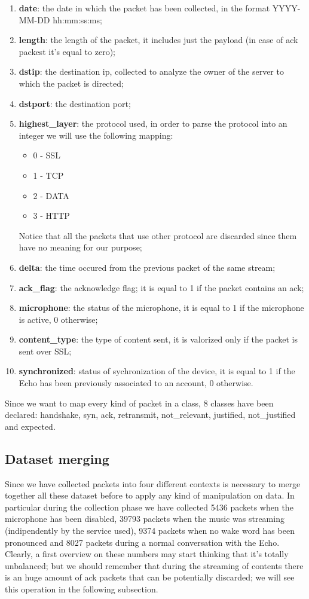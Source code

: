 \documentclass[sigconf]{acmart}
\begin{document}
    \begin{enumerate}
        \item \textbf{date}: the date in which the packet has been collected, in the format YYYY-MM-DD hh:mm:ss:ms;
        \item \textbf{length}: the length of the packet, it includes just the payload (in case of ack packest it's equal to zero);
        \item \textbf{dstip}: the destination ip, collected to analyze the owner of the server to which the packet is directed;
        \item \textbf{dstport}: the destination port;
        \item \textbf{highest\_layer}: the protocol used, in order to parse the protocol into an integer we will use the following mapping:
        \begin{itemize}
            \item 0 - SSL
            \item 1 - TCP
            \item 2 - DATA
            \item 3 - HTTP
        \end{itemize}
        Notice that all the packets that use other protocol are discarded since them have no meaning for our purpose;
        \item \textbf{delta}: the time occured from the previous packet of the same stream;
        \item \textbf{ack\_flag}: the acknowledge flag; it is equal to 1 if the packet contains an ack;
        \item \textbf{microphone}: the status of the microphone, it is equal to 1 if the microphone is active, 0 otherwise;
        \item \textbf{content\_type}: the type of content sent, it is valorized only if the packet is sent over SSL;
        \item \textbf{synchronized}: status of sychronization of the device, it is equal to 1 if the Echo has been previously associated to an account, 0 otherwise.
    \end{enumerate}
    Since we want to map every kind of packet in a class, 8 classes have been declared: handshake, syn, ack, retransmit, not\_relevant, justified, not\_justified and expected. 
	\subsection{Dataset merging}
	Since we have collected packets into four different contexts is necessary to merge together all these dataset before to apply any kind of manipulation on data. In particular during the collection phase we have collected 5436 packets when the microphone has been disabled, 39793 packets when the music was streaming (indipendently by the service used), 9374 packets when no wake word has been pronounced and 8027 packets during a normal conversation with the Echo. Clearly, a first overview on these numbers may start thinking that it's totally unbalanced; but we should remember that during the streaming of contents there is an huge amount of ack packets that can be potentially discarded; we will see this operation in the following subsection.
\end{document}
